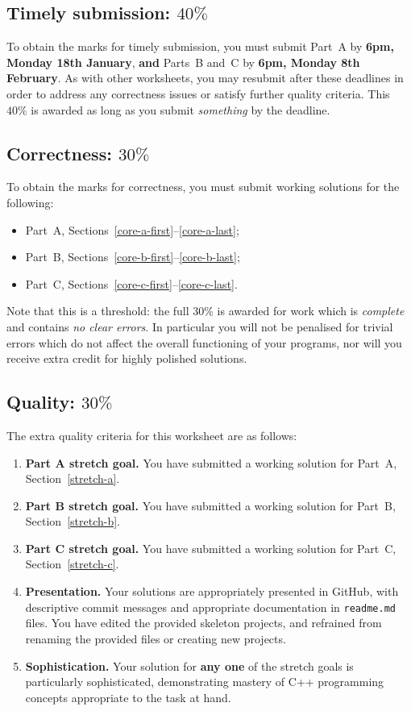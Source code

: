 \documentclass{scrartcl}
\begin{document}
\subsection*{Timely submission: $40\%$}

To obtain the marks for timely submission, you must submit Part~A by \textbf{6pm, Monday 18th January},
\textbf{and} Parts~B and~C by \textbf{6pm, Monday 8th February}.
As with other worksheets, you may resubmit after these deadlines in order to address any correctness issues
or satisfy further quality criteria. This $40\%$ is awarded as long as you submit \emph{something} by the deadline.

\subsection*{Correctness: $30\%$}

To obtain the marks for correctness, you must submit working solutions for the following:
\begin{itemize}
\item Part~A, Sections~\ref{core-a-first}--\ref{core-a-last};
\item Part~B, Sections~\ref{core-b-first}--\ref{core-b-last};
\item Part~C, Sections~\ref{core-c-first}--\ref{core-c-last}.
\end{itemize}
Note that this is a threshold: the full $30\%$ is awarded for work which is \emph{complete}
and contains \emph{no clear errors}. In particular you will not be penalised for trivial errors which do not
affect the overall functioning of your programs, nor will you receive extra credit for highly polished solutions.

\subsection*{Quality: $30\%$}

The extra quality criteria for this worksheet are as follows:
\begin{enumerate}
\item\textbf{Part A stretch goal.} You have submitted a working solution for Part~A, Section~\ref{stretch-a}.
\item\textbf{Part B stretch goal.} You have submitted a working solution for Part~B, Section~\ref{stretch-b}.
\item\textbf{Part C stretch goal.} You have submitted a working solution for Part~C, Section~\ref{stretch-c}.
\item\textbf{Presentation.} Your solutions are appropriately presented in GitHub, with descriptive commit messages
	and appropriate documentation in \texttt{readme.md} files.
	You have edited the provided skeleton projects, and refrained from renaming the provided files or creating new projects.
\item\textbf{Sophistication.} Your solution for \textbf{any one} of the stretch goals is particularly sophisticated,
	demonstrating mastery of C++ programming concepts appropriate to the task at hand.
\end{enumerate}

\clearpage


\clearpage


\clearpage


\section{}
\end{document}
